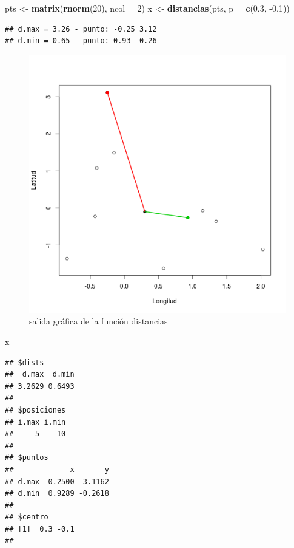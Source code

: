 \documentclass[]{article}
\makeatletter
\newenvironment{Shaded}{}{}
\newcommand{\KeywordTok}[1]{\textcolor[rgb]{0.00,0.44,0.13}{\textbf{{#1}}}}
\newcommand{\DataTypeTok}[1]{\textcolor[rgb]{0.56,0.13,0.00}{{#1}}}
\newcommand{\DecValTok}[1]{\textcolor[rgb]{0.25,0.63,0.44}{{#1}}}
\newcommand{\FloatTok}[1]{\textcolor[rgb]{0.25,0.63,0.44}{{#1}}}
\newcommand{\NormalTok}[1]{{#1}}
\def\maxwidth{\ifdim\Gin@nat@width>\linewidth\linewidth
\else\Gin@nat@width\fi}
\let\Oldincludegraphics\includegraphics
\renewcommand{\includegraphics}[1]{\Oldincludegraphics[width=\maxwidth]{#1}}
\makeatother
\begin{document}
\begin{Shaded}
\begin{Highlighting}[]
\NormalTok{pts <- }\KeywordTok{matrix}\NormalTok{(}\KeywordTok{rnorm}\NormalTok{(}\DecValTok{20}\NormalTok{), }\DataTypeTok{ncol =} \DecValTok{2}\NormalTok{)}
\NormalTok{x <- }\KeywordTok{distancias}\NormalTok{(pts, }\DataTypeTok{p =} \KeywordTok{c}\NormalTok{(}\FloatTok{0.3}\NormalTok{, -}\FloatTok{0.1}\NormalTok{))}
\end{Highlighting}
\end{Shaded}
\begin{verbatim}
## d.max = 3.26 - punto: -0.25 3.12 
## d.min = 0.65 - punto: 0.93 -0.26 
\end{verbatim}
\begin{figure}[htbp]
\centering
\includegraphics{figure/unnamed-chunk-11.png}
\caption{salida gráfica de la función distancias}
\end{figure}

\begin{Shaded}
\begin{Highlighting}[]
\NormalTok{x}
\end{Highlighting}
\end{Shaded}
\begin{verbatim}
## $dists
##  d.max  d.min 
## 3.2629 0.6493 
## 
## $posiciones
## i.max i.min 
##     5    10 
## 
## $puntos
##             x       y
## d.max -0.2500  3.1162
## d.min  0.9289 -0.2618
## 
## $centro
## [1]  0.3 -0.1
## 
\end{verbatim}
\end{document}
